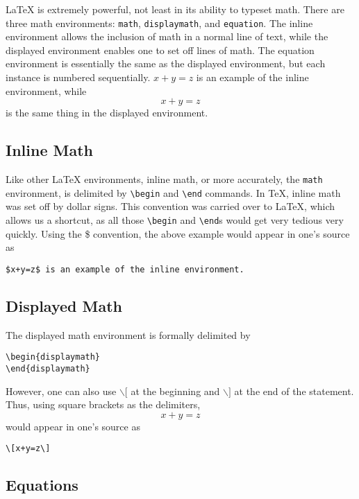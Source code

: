 \LaTeX{} is extremely powerful, not least in its ability to typeset
math.  There are three math environments: \texttt{math},
\texttt{displaymath}, and \texttt{equation}.  The inline environment
allows the inclusion of math in a normal line of text, while the
displayed environment enables one to set off lines of math.  The
equation environment is essentially the same as the displayed
environment, but each instance is numbered sequentially.  $x+y=z$ is
an example of the inline environment, while \[x+y=z\] is the same
thing in the displayed environment.

\subsection{Inline Math}
\label{sec:inline-math}

Like other \LaTeX{} environments, inline math, or more accurately, the
\texttt{math} environment, is delimited by \verb=\begin= and
\verb=\end= commands.  In \TeX{}, inline math was set off by dollar
signs.  This convention was carried over to \LaTeX{}, which allows us
a shortcut, as all those \verb=\begin= and \verb=\end=s would get very
tedious very quickly.  Using the \$ convention, the above example
would appear in one's source as
\begin{verbatim}
$x+y=z$ is an example of the inline environment.
\end{verbatim}

\subsection{Displayed Math}
\label{sec:displayed-math}

The displayed math environment is formally delimited by
\begin{verbatim}
\begin{displaymath}
\end{displaymath}
\end{verbatim}
However, one can also use $\backslash [$ at the beginning and
$\backslash ]$ at the end of the statement.  Thus, using square
brackets as the delimiters, \[x+y=z\] would appear in one's source as
\begin{verbatim}
\[x+y=z\]
\end{verbatim}

\subsection{Equations}
\label{sec:equations}


